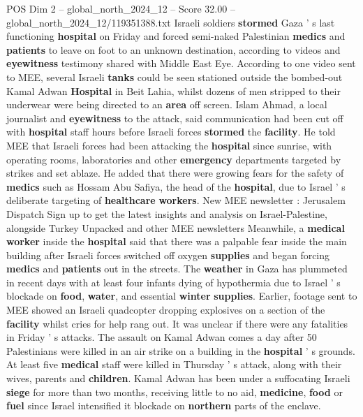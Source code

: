 \begin{textsample}{POS Dim 2 – global\_north\_2024\_12 – Score 32.00 – global\_north\_2024\_12/119351388.txt}  \label{ex:f2_pos_184}
Israeli soldiers \textbf{stormed} Gaza ' s last functioning \textbf{hospital} on Friday and forced semi-naked Palestinian \textbf{medics} and \textbf{patients} to leave on foot to an unknown destination, according to videos and \textbf{eyewitness} testimony shared with Middle East Eye.
According to one video sent to MEE, several Israeli \textbf{tanks} could be seen stationed outside the bombed-out Kamal Adwan \textbf{Hospital} in Beit Lahia, whilst dozens of men stripped to their underwear were being directed to an \textbf{area} off screen.
Islam Ahmad, a local journalist and \textbf{eyewitness} to the attack, said communication had been cut off with \textbf{hospital} staff hours before Israeli forces \textbf{stormed} the \textbf{facility}.
He told MEE that Israeli forces had been attacking the \textbf{hospital} since sunrise, with operating rooms, laboratories and other \textbf{emergency} departments targeted by strikes and set ablaze.
He added that there were growing fears for the safety of \textbf{medics} such as Hossam Abu Safiya, the head of the \textbf{hospital}, due to Israel ' s deliberate targeting of \textbf{healthcare} \textbf{workers}.
New MEE newsletter : Jerusalem Dispatch Sign up to get the latest insights and analysis on Israel-Palestine, alongside Turkey Unpacked and other MEE newsletters Meanwhile, a \textbf{medical} \textbf{worker} inside the \textbf{hospital} said that there was a palpable fear inside the main building after Israeli forces switched off oxygen \textbf{supplies} and began forcing \textbf{medics} and \textbf{patients} out in the streets.
The \textbf{weather} in Gaza has plummeted in recent days with at least four infants dying of hypothermia due to Israel ' s blockade on \textbf{food}, \textbf{water}, and essential \textbf{winter} \textbf{supplies}.
Earlier, footage sent to MEE showed an Israeli quadcopter dropping explosives on a section of the \textbf{facility} whilst cries for help rang out.
It was unclear if there were any fatalities in Friday ' s attacks.
The assault on Kamal Adwan comes a day after 50 Palestinians were killed in an air strike on a building in the \textbf{hospital} ' s grounds.
At least five \textbf{medical} staff were killed in Thursday ' s attack, along with their wives, parents and \textbf{children}.
Kamal Adwan has been under a suffocating Israeli \textbf{siege} for more than two months, receiving little to no aid, \textbf{medicine}, \textbf{food} or \textbf{fuel} since Israel intensified it blockade on \textbf{northern} parts of the enclave.

\end{textsample}
